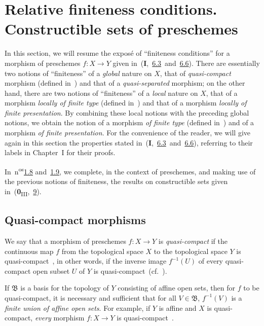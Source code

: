 \section{Relative finiteness conditions. Constructible sets of preschemes}
\label{section:IV.1}

In this section, we will resume the expos\'e of ``finiteness conditions'' for a morphism of preschemes $f:X\to Y$ given in~(\textbf{I},~\hyperref[subsection:I.6.3]{6.3}~and~\hyperref[subsection:I.6.6]{6.6}).
There are essentially two notions of ``finiteness'' of a \emph{global} nature on $X$, that of \emph{quasi-compact} morphism (defined in~) and that of a \emph{quasi-separated} morphism; on the other hand, there are two notions of ``finiteness'' of a \emph{local} nature on $X$, that of a morphism \emph{locally of finite type} (defined in~) and that of a morphism \emph{locally of finite presentation}.
By combining these local notions with the preceding global notions, we obtain the notion of a morphism \emph{of finite type} (defined in~) and of a morphism \emph{of finite presentation}.
For the convenience of the reader, we will give again in this section the properties stated in~(\textbf{I},~\hyperref[subsection:I.6.3]{6.3}~and~\hyperref[subsection:I.6.6]{6.6}), referring to their labels in Chapter~I for their proofs.

In~n\textsuperscript{os}\hyperref[subsection:IV.1.8]{1.8} and~\hyperref[subsection:IV.1.9]{1.9}, we complete, in the context of preschemes, and making use of the previous notions of finiteness, the results on constructible sets given in~(\textbf{0}\textsubscript{III},~\textsection\hyperref[section:0.9]{9}).

\subsection{Quasi-compact morphisms}
\label{subsection:IV.1.1}

\begin{definition}[1.1.1]
\label{IV.1.1.1}
We say that a morphism of preschemes $f:X\to Y$ is \emph{quasi-compact} if the continuous map $f$ from the topological space $X$ to the topological space $Y$ is quasi-compact~, in other words, if the inverse image $f^{-1}(U)$ of every quasi-compact open subset $U$ of $Y$ is quasi-compact~(cf.~).
\end{definition}

If $\mathfrak{B}$ is a basis for the topology of $Y$ consisting of affine open sets, then for $f$ to be quasi-compact, it is necessary and sufficient that for all $V\in\mathfrak{B}$, $f^{-1}(V)$ is a \emph{finite union of affine open sets}.
For example, if $Y$ is affine and $X$ is quasi-compact, \emph{every} morphism $f:X\to Y$ is quasi-compact~.

